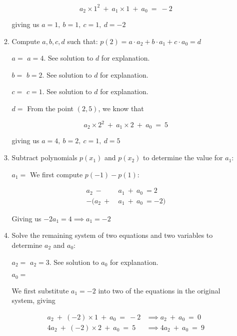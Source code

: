 \documentclass[11pt, preview]{standalone} %
\begin{document}
\begin{enumerate}
\begin{enumerate}
\begin{Freeform}{-2}
$$a_2 \times 1^2\ +\ a_1 \times 1\ +\ a_0\ =\ -2$$

giving us $a = 1,\ b = 1,\ c = 1,\ d = -2$
\end{Freeform}

\item Compute $a,b,c,d$ such that: $p(2) = a \cdot a_2 + b \cdot a_1 + c \cdot a_0 = d$
\begin{Freeform}{4}
$a = $
\Solution $a = 4$. See solution to $d$ for explanation.
\end{Freeform}
\begin{Freeform}{2}
$b = $
\Solution $b = 2$. See solution to $d$ for explanation.
\end{Freeform}
\begin{Freeform}{1}
$c = $
\Solution $c = 1$. See solution to $d$ for explanation.
\end{Freeform}
\begin{Freeform}{5}
$d = $
\Solution From the point $(2, 5)$, we know that 

$$a_2 \times 2^2\ +\ a_1 \times 2\ +\ a_0\ =\ 5$$

giving us $a = 4,\ b = 2,\ c = 1,\ d = 5$
\end{Freeform}

\item Subtract polynomials $p(x_1)$ and $p(x_2)$ to determine the value for $a_1$:
\begin{Freeform}{-2}
$a_1 = $
\Solution We first compute $p(-1) - p(1)$:

\begin{align*}
a_2\ -\ &a_1\ +\ a_0\ = 2\\
-(a_2\ +\ &a_1\ +\ a_0\ = -2) 
\end{align*}

Giving us $-2a_1 = 4 \implies a_1 = -2$
\end{Freeform}

\item Solve the remaining system of two equations and two variables to determine $a_2$ and $a_0$:
\begin{Freeform}{3}
$a_2 = $ 
\Solution $a_2 = 3$. See solution to $a_0$ for explanation.
\end{Freeform}
\begin{Freeform}{-3}
$a_0 = $ 

\Solution We first substitute $a_1 = -2$ into two of the equations in the original system, giving

\begin{align*}
a_2\ +\ (-2) \times 1\ +\ a_0\ =\ -2 &\implies a_2\ +\ a_0\ =\ 0\\
4a_2\ +\ (-2) \times 2\ +\ a_0\ =\ 5 &\implies 4a_2\ +\ a_0\ =\ 9
\end{align*}


\end{Freeform}
\end{enumerate}
\end{enumerate}
\end{document}
